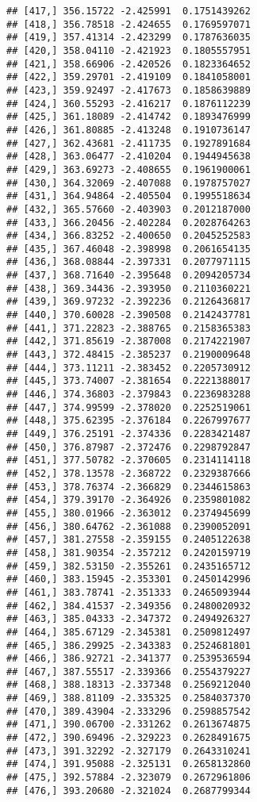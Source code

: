 \documentclass[]{book}
\theoremstyle{definition}
\theoremstyle{definition}
\theoremstyle{definition}
\theoremstyle{remark}
\begin{document}
\begin{verbatim}
## [417,] 356.15722 -2.425991  0.1751439262
## [418,] 356.78518 -2.424655  0.1769597071
## [419,] 357.41314 -2.423299  0.1787636035
## [420,] 358.04110 -2.421923  0.1805557951
## [421,] 358.66906 -2.420526  0.1823364652
## [422,] 359.29701 -2.419109  0.1841058001
## [423,] 359.92497 -2.417673  0.1858639889
## [424,] 360.55293 -2.416217  0.1876112239
## [425,] 361.18089 -2.414742  0.1893476999
## [426,] 361.80885 -2.413248  0.1910736147
## [427,] 362.43681 -2.411735  0.1927891684
## [428,] 363.06477 -2.410204  0.1944945638
## [429,] 363.69273 -2.408655  0.1961900061
## [430,] 364.32069 -2.407088  0.1978757027
## [431,] 364.94864 -2.405504  0.1995518634
## [432,] 365.57660 -2.403903  0.2012187000
## [433,] 366.20456 -2.402284  0.2028764263
## [434,] 366.83252 -2.400650  0.2045252583
## [435,] 367.46048 -2.398998  0.2061654135
## [436,] 368.08844 -2.397331  0.2077971115
## [437,] 368.71640 -2.395648  0.2094205734
## [438,] 369.34436 -2.393950  0.2110360221
## [439,] 369.97232 -2.392236  0.2126436817
## [440,] 370.60028 -2.390508  0.2142437781
## [441,] 371.22823 -2.388765  0.2158365383
## [442,] 371.85619 -2.387008  0.2174221907
## [443,] 372.48415 -2.385237  0.2190009648
## [444,] 373.11211 -2.383452  0.2205730912
## [445,] 373.74007 -2.381654  0.2221388017
## [446,] 374.36803 -2.379843  0.2236983288
## [447,] 374.99599 -2.378020  0.2252519061
## [448,] 375.62395 -2.376184  0.2267997677
## [449,] 376.25191 -2.374336  0.2283421487
## [450,] 376.87987 -2.372476  0.2298792847
## [451,] 377.50782 -2.370605  0.2314114118
## [452,] 378.13578 -2.368722  0.2329387666
## [453,] 378.76374 -2.366829  0.2344615863
## [454,] 379.39170 -2.364926  0.2359801082
## [455,] 380.01966 -2.363012  0.2374945699
## [456,] 380.64762 -2.361088  0.2390052091
## [457,] 381.27558 -2.359155  0.2405122638
## [458,] 381.90354 -2.357212  0.2420159719
## [459,] 382.53150 -2.355261  0.2435165712
## [460,] 383.15945 -2.353301  0.2450142996
## [461,] 383.78741 -2.351333  0.2465093944
## [462,] 384.41537 -2.349356  0.2480020932
## [463,] 385.04333 -2.347372  0.2494926327
## [464,] 385.67129 -2.345381  0.2509812497
## [465,] 386.29925 -2.343383  0.2524681801
## [466,] 386.92721 -2.341377  0.2539536594
## [467,] 387.55517 -2.339366  0.2554379227
## [468,] 388.18313 -2.337348  0.2569212040
## [469,] 388.81109 -2.335325  0.2584037370
## [470,] 389.43904 -2.333296  0.2598857542
## [471,] 390.06700 -2.331262  0.2613674875
## [472,] 390.69496 -2.329223  0.2628491675
## [473,] 391.32292 -2.327179  0.2643310241
## [474,] 391.95088 -2.325131  0.2658132860
## [475,] 392.57884 -2.323079  0.2672961806
## [476,] 393.20680 -2.321024  0.2687799344

\end{verbatim}
\end{document}
